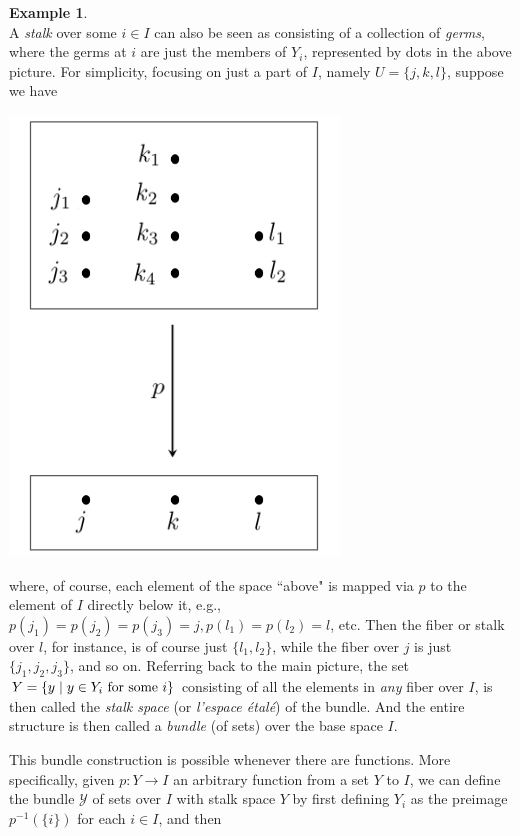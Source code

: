 \documentclass[a4paper]{book}
\theoremstyle{definition}
\newtheorem{example}{Example}[section]
\theoremstyle{definition}
\theoremstyle{definition}
\theoremstyle{theorem}
\theoremstyle{definition}
\begin{document}
\begin{example}
\begin{equation*}
\end{equation*} 
A \textit{stalk} over some $i \in I$ can also be seen as consisting of a collection of \textit{germs}, where the germs at $i$ are just the members of $Y_i$, represented by dots in the above picture. For simplicity, focusing on just a part of $I$, namely $U = \{j,k,l\}$, suppose we have
\begin{center}
	\includegraphics*[scale=0.27]{FiberThingy.png}
\end{center}
where, of course, each element of the space ``above" is mapped via $p$ to the element of $I$ directly below it, e.g., $p(j_1) = p(j_2) = p(j_3) = j, p(l_1) = p(l_2) = l$, etc. Then the fiber or stalk over $l$, for instance, is of course just $\{l_1, l_2\}$, while the fiber over $j$ is just $\{j_1, j_2, j_3\}$, and so on. Referring back to the main picture, the set $Y = \{y \hspace*{0.3em}| \hspace*{0.3em} y \in Y_i \text{ for some } i\}$ consisting of all the elements in \textit{any} fiber over $I$, is then called the \textit{stalk space} (or \textit{l'espace \'etal\'e}) of the bundle. And the entire structure is then called a \textit{bundle} (of sets) over the base space $I$. \par 
This bundle construction is possible whenever there are functions. More specifically, given $p: Y \rightarrow I$ an arbitrary function from a set $Y$ to $I$, we can define the bundle $\mathscr{Y}$ of sets over $I$ with stalk space $Y$ by first defining $Y_i$ as the preimage $p^{-1}(\{i\})$ for each $i \in I$, and then 

\end{example}
\end{document}
